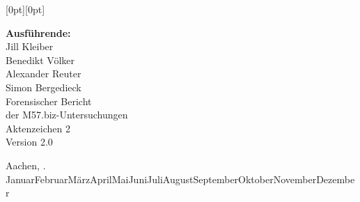 \documentclass[a4paper, 12pt, ngerman]{scrreprt}
\newcommand{\monthword}[1]{\ifcase#1\or Januar\or Februar\or März\or April\or	Mai\or Juni\or Juli\or August\or September\or Oktober\or November\or Dezember\fi}
\begin{document}
	\begin{titlepage}
		\hspace*{17.5cm}\raisebox{-2.6cm}[0pt][0pt]{%
		}%

	{
		\centering
		{
			\large
			\textbf{Ausführende:}\\
			Jill Kleiber\\
			Benedikt Völker\\
			Alexander Reuter\\
			Simon Bergedieck\\
		}
		\vfill
		{
			\Huge
			Forensischer Bericht\\
			der M57.biz-Untersuchungen\\
		}
		\vspace{1cm}
		{
			\large
			Aktenzeichen 2\\
			Version 2.0
		}
		\vfill
	}

	{
		\raggedleft
		Aachen, \the\day. \monthword{\the\month} \the\year \\
	}
	\end{titlepage}
	\setcounter{page}{1}

	\tableofcontents





\begin{appendix}
	
\end{appendix}
\end{document}
